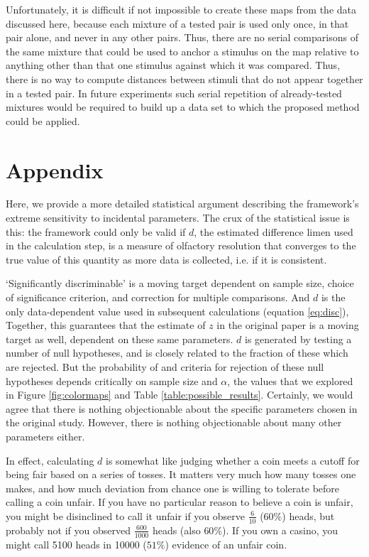 \documentclass[letterpaper,twocolumn,10pt]{article}
\begin{document}
Unfortunately, it is difficult if not impossible to create these maps from the data discussed here, 
because each mixture of a tested pair is used only once, 
in that pair alone, and never in any other pairs.  
Thus, there are no serial comparisons of the same mixture that could be used to anchor a stimulus on the map 
relative to anything other than that one stimulus against which it was compared.  
Thus, there is no way to compute distances between stimuli that do not appear together in a tested pair.  
In future experiments such serial repetition of already-tested mixtures would be required 
to build up a data set to which the proposed method could be applied.  
\section{Appendix} 

Here, we provide a more detailed statistical argument describing the framework's extreme sensitivity to incidental parameters. 
The crux of the statistical issue is this: 
the framework could only be valid if $d$, the estimated difference limen used in the calculation step, 
is a measure of olfactory resolution that converges to the true value of this quantity as more data is collected, 
i.e. if it is consistent. 

`Significantly discriminable' is a moving target dependent on sample size, 
choice of significance criterion, and correction for multiple comparisons. And
 $d$ is the only data-dependent value used in subsequent calculations (equation \ref{eq:disc}), 
Together, this guarantees that the estimate of $z$ in the original paper is a moving target as well, 
dependent on these same parameters.
$d$ is generated by testing a number of null hypotheses, 
and is closely related to the fraction of these which are rejected.  
But the probability of and criteria for rejection of these null hypotheses depends critically on sample size and $\alpha$, the values
that we explored in Figure \ref{fig:colormaps} and Table \ref{table:possible_results}. 
Certainly, we would agree that there is nothing objectionable about the specific parameters chosen in the original study. 
However, there is nothing objectionable about many other parameters either. 

In effect, calculating $d$ is somewhat like judging whether a coin meets a cutoff for being fair based on a series of tosses. 
It matters very much how many tosses one makes, 
and how much deviation from chance one is willing to tolerate before calling a coin unfair. 
If you have no particular reason to believe a coin is unfair, 
you might be disinclined to call it unfair if you observe $\frac{6}{10}$ ($60\%$) heads, 
but probably not if you observed $\frac{600}{1000}$ heads 
(also $60\%$). 
If you own a casino, you might call 5100 heads in 10000 ($51\%$) evidence of an unfair coin. 
\end{document}
